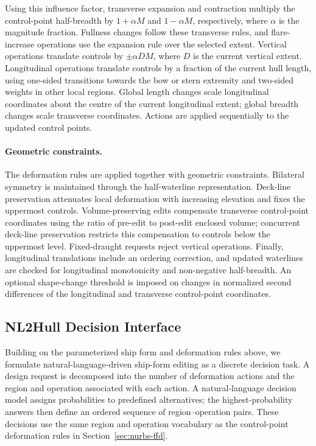 \documentclass[a4paper,fleqn]{cas-dc}
\begin{document}
Using this influence factor, transverse expansion and contraction multiply the
control-point half-breadth by
$1+\alpha M$ and $1-\alpha M$, respectively, where $\alpha$ is the magnitude
fraction. Fullness changes follow these transverse rules, and flare-increase
operations use the expansion rule over the selected extent. Vertical operations
translate controls by $\pm\alpha D M$, where $D$ is the current vertical extent.
Longitudinal operations translate controls by a fraction of the current hull
length, using one-sided transitions towards the bow or stern extremity and
two-sided weights in other local regions. Global length changes scale
longitudinal coordinates about the centre of the current longitudinal extent;
global breadth changes scale transverse coordinates. Actions are applied
sequentially to the updated control points.

\paragraph{Geometric constraints.}
The deformation rules are applied together with geometric constraints. Bilateral
symmetry is maintained through the half-waterline representation. Deck-line
preservation attenuates local deformation with increasing elevation and fixes the
uppermost controls. Volume-preserving edits compensate transverse control-point
coordinates using the ratio of pre-edit to post-edit enclosed volume; concurrent
deck-line preservation restricts this compensation to controls below the
uppermost level. Fixed-draught requests reject vertical operations. Finally,
longitudinal translations include an ordering correction, and updated waterlines
are checked for longitudinal monotonicity and non-negative half-breadth. An
optional shape-change threshold is imposed on changes in normalized second
differences of the longitudinal and transverse control-point coordinates.

\subsection{NL2Hull Decision Interface}
\label{sec:decision-framework}

Building on the parameterized ship form and deformation rules above, we formulate
natural-language-driven ship-form editing as a discrete decision task. A design
request is decomposed into the number of deformation actions and the region and
operation associated with each action. A natural-language decision model assigns
probabilities to predefined alternatives; the highest-probability answers then
define an ordered sequence of region--operation pairs. These decisions use the
same region and operation vocabulary as the control-point deformation rules in
Section~\ref{sec:nurbs-ffd}.
\end{document}
